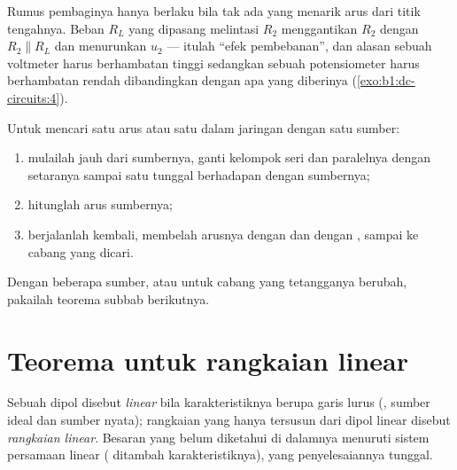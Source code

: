 \begin{remark}\label{rem:b1:dc-circuits:loading}
Rumus pembaginya hanya berlaku bila tak ada yang menarik arus dari titik
tengahnya. Beban $R_L$ yang dipasang melintasi $R_2$ menggantikan $R_2$
dengan $R_2
\parallel R_L$ dan menurunkan $u_2$ --- itulah ``efek pembebanan'', dan
alasan sebuah voltmeter harus berhambatan tinggi sedangkan sebuah
potensiometer harus berhambatan rendah dibandingkan dengan apa yang
diberinya (\cref{exo:b1:dc-circuits:4}).
\end{remark}

\begin{method}\label{met:b1:dc-circuits:reduce}
Untuk mencari satu arus atau satu  dalam jaringan 
dengan satu sumber:
\begin{enumerate}
  \item mulailah jauh dari sumbernya, ganti kelompok seri dan paralelnya
        dengan setaranya sampai satu  tunggal berhadapan dengan
        sumbernya;
  \item hitunglah arus sumbernya;
  \item berjalanlah kembali, membelah arusnya dengan  dan
         dengan , sampai ke cabang yang dicari.
\end{enumerate}
Dengan beberapa sumber, atau untuk cabang yang tetangganya berubah,
pakailah teorema subbab berikutnya.
\end{method}

\section{Teorema untuk rangkaian linear}

\begin{definition}\label{def:b1:dc-circuits:linear}
Sebuah dipol disebut \emph{linear} bila karakteristiknya berupa garis
lurus (, sumber ideal dan sumber nyata); rangkaian yang hanya
tersusun dari dipol linear disebut \emph{rangkaian linear}. Besaran yang
belum diketahui di dalamnya menuruti sistem persamaan linear ( ditambah karakteristiknya), yang penyelesaiannya tunggal.
\end{definition}

